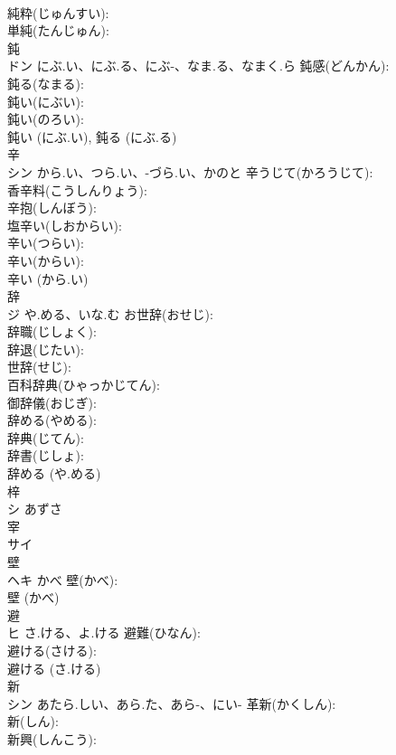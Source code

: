 \documentclass[8pt]{extreport}
\begin{document}
\begin{CJK}{UTF8}{min}
\\	純粋(じゅんすい): 
\\	単純(たんじゅん): 
\\	鈍			
\\	ドン	にぶ.い、にぶ.る、にぶ-、なま.る、なまく.ら	鈍感(どんかん): 
\\	鈍る(なまる): 
\\	鈍い(にぶい): 
\\	鈍い(のろい): 
\\	鈍い (にぶ.い), 鈍る (にぶ.る)
\\	辛			
\\	シン	から.い、つら.い、-づら.い、かのと	辛うじて(かろうじて): 
\\	香辛料(こうしんりょう): 
\\	辛抱(しんぼう): 
\\	塩辛い(しおからい): 
\\	辛い(つらい): 
\\	辛い(からい): 
\\	辛い (から.い)
\\	辞			
\\	ジ	や.める、いな.む	お世辞(おせじ): 
\\	辞職(じしょく): 
\\	辞退(じたい): 
\\	世辞(せじ): 
\\	百科辞典(ひゃっかじてん): 
\\	御辞儀(おじぎ): 
\\	辞める(やめる): 
\\	辞典(じてん): 
\\	辞書(じしょ): 
\\	辞める (や.める)
\\	梓			
\\	シ	あずさ		
\\	宰			
\\	サイ			
\\	壁			
\\	ヘキ	かべ	壁(かべ): 
\\	壁 (かべ)
\\	避			
\\	ヒ	さ.ける、よ.ける	避難(ひなん): 
\\	避ける(さける): 
\\	避ける (さ.ける)
\\	新			
\\	シン	あたら.しい、あら.た、あら-、にい-	革新(かくしん): 
\\	新(しん): 
\\	新興(しんこう): 

\end{CJK}
\end{document}
